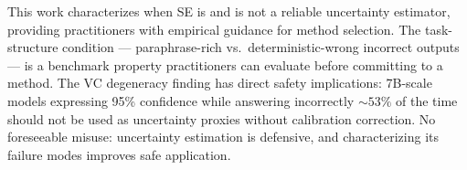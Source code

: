 This work characterizes when SE is and is not a reliable uncertainty estimator, providing practitioners with empirical guidance for method selection.
The task-structure condition --- paraphrase-rich vs.\ deterministic-wrong incorrect outputs --- is a benchmark property practitioners can evaluate before committing to a method.
The VC degeneracy finding has direct safety implications: 7B-scale models expressing 95\% confidence while answering incorrectly ${\sim}53\%$ of the time should not be used as uncertainty proxies without calibration correction.
No foreseeable misuse: uncertainty estimation is defensive, and characterizing its failure modes improves safe application.
